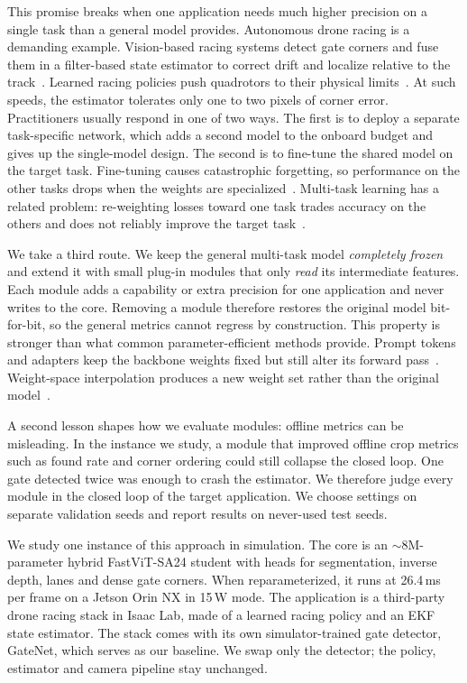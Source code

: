 \documentclass[10pt,twocolumn,letterpaper]{article}
\begin{document}
This promise breaks when one application needs much higher precision on a single task than a general model provides. Autonomous drone racing is a demanding example. Vision-based racing systems detect gate corners and fuse them in a filter-based state estimator to correct drift and localize relative to the track~\cite{Foehn2020AlphapilotAutonomous}. Learned racing policies push quadrotors to their physical limits~\cite{Song2023ReachingLimit}. At such speeds, the estimator tolerates only one to two pixels of corner error. Practitioners usually respond in one of two ways. The first is to deploy a separate task-specific network, which adds a second model to the onboard budget and gives up the single-model design. The second is to fine-tune the shared model on the target task. Fine-tuning causes catastrophic forgetting, so performance on the other tasks drops when the weights are specialized~\cite{Kirkpatrick2016OvercomingCatastrophic,Wang2023ComprehensiveSurvey}. Multi-task learning has a related problem: re-weighting losses toward one task trades accuracy on the others and does not reliably improve the target task~\cite{Xin2022DoCurrent,Lin2023DualbalancingMultitask}.

We take a third route. We keep the general multi-task model \emph{completely frozen} and extend it with small plug-in modules that only \emph{read} its intermediate features. Each module adds a capability or extra precision for one application and never writes to the core. Removing a module therefore restores the original model bit-for-bit, so the general metrics cannot regress by construction. This property is stronger than what common parameter-efficient methods provide. Prompt tokens and adapters keep the backbone weights fixed but still alter its forward pass~\cite{Jia2022VisualPrompt,Chen2022AdaptformerAdapting,Chen2022VisionTransformer}. Weight-space interpolation produces a new weight set rather than the original model~\cite{Wortsman2021RobustFinetuning}.

A second lesson shapes how we evaluate modules: offline metrics can be misleading. In the instance we study, a module that improved offline crop metrics such as found rate and corner ordering could still collapse the closed loop. One gate detected twice was enough to crash the estimator. We therefore judge every module in the closed loop of the target application. We choose settings on separate validation seeds and report results on never-used test seeds.

We study one instance of this approach in simulation. The core is an $\sim$8M-parameter hybrid FastViT-SA24 student with heads for segmentation, inverse depth, lanes and dense gate corners. When reparameterized, it runs at 26.4\,ms per frame on a Jetson Orin NX in 15\,W mode. The application is a third-party drone racing stack in Isaac Lab, made of a learned racing policy and an EKF state estimator. The stack comes with its own simulator-trained gate detector, GateNet, which serves as our baseline. We swap only the detector; the policy, estimator and camera pipeline stay unchanged.
\end{document}
